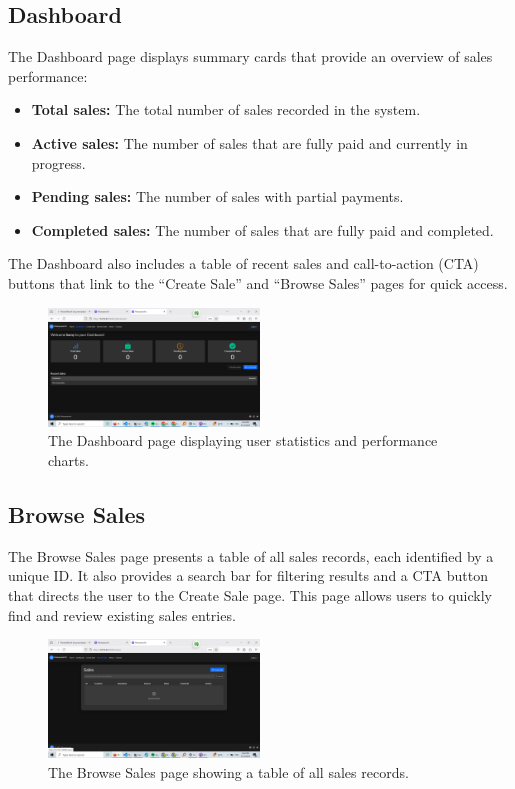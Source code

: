 \documentclass[12pt]{article}
\begin{document}
\subsection{Dashboard}
The Dashboard page displays summary cards that provide an overview of sales performance:
\begin{itemize}
    \item \textbf{Total sales:} The total number of sales recorded in the system.
    \item \textbf{Active sales:} The number of sales that are fully paid and currently in progress.
    \item \textbf{Pending sales:} The number of sales with partial payments.
    \item \textbf{Completed sales:} The number of sales that are fully paid and completed.
\end{itemize}
The Dashboard also includes a table of recent sales and call-to-action (CTA) buttons that link to the 
``Create Sale'' and ``Browse Sales'' pages for quick access.
\begin{figure}[H]
    \centering
    \includegraphics[width=0.5\textwidth]{dashboard.png}
    \caption{The Dashboard page displaying user statistics and performance charts.}
\end{figure}

\subsection{Browse Sales}
The Browse Sales page presents a table of all sales records, each identified by a unique ID. 
It also provides a search bar for filtering results and a CTA button that directs the user to the Create Sale page. This page allows users to quickly find and review existing sales entries.
\begin{figure}[H]
    \centering
    \includegraphics[width=0.5\textwidth]{browse_sales.png}
    \caption{The Browse Sales page showing a table of all sales records.}
\end{figure}
\end{document}
